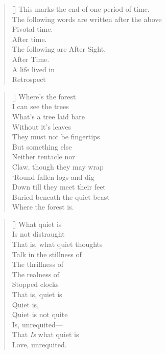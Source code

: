\documentclass{article}
\begin{document}
\settowidth{\versewidth}{Than Tycho Brahe, or Erra Pater:}
\begin{verse}[\versewidth]
This marks the end of one period of time. \\
The following words are written after the above \\
Pivotal time. \\
After time. \\
The following are After Sight, \\
After Time. \\
A life lived in \\
Retrospect \\
\end{verse}

\settowidth{\versewidth}{Than Tycho Brahe, or Erra Pater:}
\begin{verse}[\versewidth]
Where’s the forest \\
I can see the trees \\
What’s a tree laid bare \\
Without it’s leaves \\
They must not be fingertips \\
But something else \\
Neither tentacle nor \\
Claw, though they may wrap \\
‘Round fallen logs and dig \\
Down till they meet their feet \\
Buried beneath the quiet beast \\
Where the forest is. \\
\end{verse}

\settowidth{\versewidth}{Than Tycho Brahe, or Erra Pater:}
\begin{verse}[\versewidth]
What quiet is \\
Is not distraught \\
That is, what quiet thoughts \\
Talk in the stillness of \\
The thrillness of \\
The realness of \\
Stopped clocks \\
That is, quiet is \\
Quiet is, \\
Quiet is not quite \\
Is, unrequited— \\
That \textit{Is} what quiet is \\
Love, unrequited. \\
\end{verse}
\end{document}
